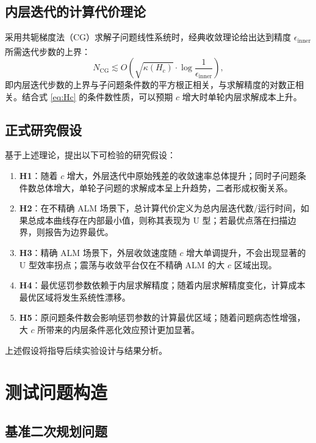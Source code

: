 \documentclass[UTF8]{ctexart}
\numberwithin{figure}{section}
\newcommand{\scite}[1]{\textsuperscript{\cite{#1}}}
\theoremstyle{definition}
\theoremstyle{examplestyle}
\theoremstyle{remark}
\begin{document}
\subsection{内层迭代的计算代价理论}
\label{sec:cg-cost}

采用共轭梯度法（CG）求解子问题线性系统时，经典收敛理论给出达到精度 $\epsilon_{\mathrm{inner}}$ 所需迭代步数的上界\scite{hestenes1952}：
\begin{equation}
\label{eq:cg-bound}
N_{\mathrm{CG}}\lesssim O\left(\sqrt{\kappa(H_c)}\cdot\log\frac{1}{\epsilon_{\mathrm{inner}}}\right),
\end{equation}
即内层迭代步数的上界与子问题条件数的平方根正相关，与求解精度的对数正相关。结合式 \eqref{eq:Hc} 的条件数性质，可以预期 $c$ 增大时单轮内层求解成本上升。

\subsection{正式研究假设}
\label{sec:hypotheses}

基于上述理论，提出以下可检验的研究假设：

\begin{enumerate}
\item \textbf{H1}：随着 $c$ 增大，外层迭代中原始残差的收敛速率总体提升；同时子问题条件数总体增大，单轮子问题的求解成本呈上升趋势，二者形成权衡关系。
\item \textbf{H2}：在不精确 ALM 场景下，总计算代价定义为总内层迭代数/运行时间，如果总成本曲线存在内部最小值，则称其表现为 U 型；若最优点落在扫描边界，则报告为边界最优。
\item \textbf{H3}：精确 ALM 场景下，外层收敛速度随 $c$ 增大单调提升，不会出现显著的 U 型效率拐点；震荡与收敛平台仅在不精确 ALM 的大 $c$ 区域出现。
\item \textbf{H4}：最优惩罚参数依赖于内层求解精度；随着内层求解精度变化，计算成本最优区域将发生系统性漂移。
\item \textbf{H5}：原问题条件数会影响惩罚参数的计算最优区域；随着问题病态性增强，大 $c$ 所带来的内层条件恶化效应预计更加显著。
\end{enumerate}

上述假设将指导后续实验设计与结果分析。

\section{测试问题构造}
\label{sec:test-problem}

\subsection{基准二次规划问题}
\label{sec:qp-benchmark}
\end{document}
